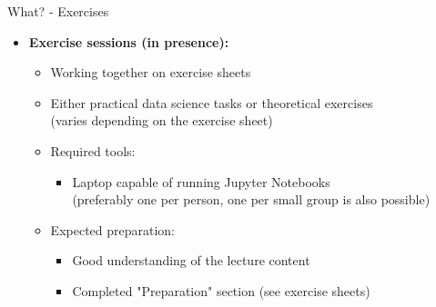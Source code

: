\begin{frame}{What? - Exercises}
	\begin{itemize}
		\item \textbf{Exercise sessions (in presence):}
		      \begin{itemize}
			      \item Working together on exercise sheets
			      \item Either practical data science tasks or theoretical exercises \\
			            {\color{gray}(varies depending on the exercise sheet)}
			      \item Required tools:
			            \begin{itemize}
				            \item Laptop capable of running Jupyter Notebooks \\
				                  {\color{gray}(preferably one per person, one per small group is also possible)}
			            \end{itemize}
			      \item Expected preparation:
			            \begin{itemize}
				            \item Good understanding of the lecture content
				            \item Completed "Preparation" section (see exercise sheets)
			            \end{itemize}
		      \end{itemize}
	\end{itemize}
\end{frame}

